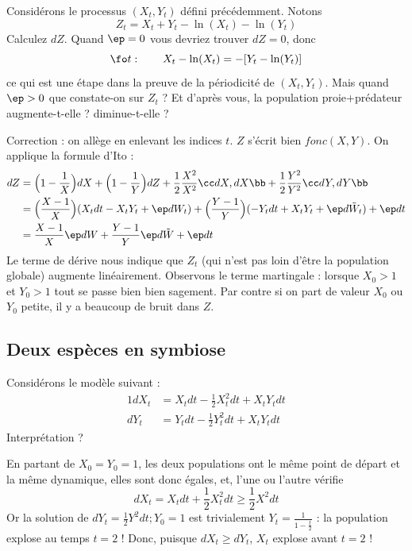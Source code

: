 \documentclass{article}
\begin{document}
\begin{exo}  Considérons le processus $(X_t,Y_t)$ défini précédemment. Notons 
$$
Z_t= X_t+Y_t - \ln(X_t) - \ln(Y_t)
$$
Calculez $dZ$.  Quand $ \ep=0 $ vous devriez trouver $dZ=0$, donc 
$$
\fo t :\qquad   X_t-\ln(X_t) =  - [Y_t -\ln(Y_t)  ]
$$ 
ce qui est une étape dans la preuve de la périodicité de $(X_t,Y_t)$.  Mais quand $\ep>0$ que constate-on sur $Z_t$ ? Et d'après vous, la population proie+prédateur augmente-t-elle ? diminue-t-elle ? 
\end{exo}


\begin{cor}
Correction : on allège en enlevant les indices $t$.  $Z$ s'écrit bien $fonc(X,Y)$. On applique la formule d'Ito : 
\begin{alignat*}{1}
dZ&=  \Big(1-\frac 1 X \Big) dX + \Big( 1- \frac 1 Y \Big) dZ + \frac 1 2 \frac {X^2} {X^2  }\cc dX , dX \bb + \frac 1 2 \frac {Y^2} {Y^2  }\cc dY , dY \bb \\
&=  \Big( \frac{X-1}X \Big) (X_t dt  - X_t Y_t  + \ep dW_t ) + \Big( \frac {Y-1}{Y} \Big) ( -Y_t dt  + X_t Y_t  + \ep d\tilde W_t) + \ep dt \\
&=  \frac {X-1}X \ep dW + \frac {Y-1}{Y} \ep d\tilde W + \ep dt
\end{alignat*}
Le terme de dérive nous indique que $Z_t$ (qui n'est pas loin d'être la population globale) augmente linéairement. Observons le terme martingale :  lorsque $X_0>1$ et $Y_0>1$ tout se passe bien bien sagement. Par contre si on part de valeur $X_0$ ou $Y_0$ petite, il y a beaucoup de bruit dans $Z$. 
\end{cor}





\subsection{Deux espèces en symbiose}

Considérons le modèle suivant : 
\begin{alignat*}{1}
dX_t &= X_t dt - \frac 12 X^2_t dt   +  X_t Y_tdt \\
dY_t &= Y_t dt - \frac 12 Y^2_t dt   +         X_t Y_t  dt 
\end{alignat*}
Interprétation ?

En partant de $X_0=Y_0=1$, les deux populations ont le même point de départ et la même dynamique, elles sont donc égales, et, l'une ou l'autre vérifie
$$
dX_t =  X_t dt + \frac 1 2  X^2_t dt \geq  \frac 1 2 X^2 dt 
$$
Or la solution de $dY_t =  \frac 1 2 Y^2 dt ; Y_0=1$ est trivialement $Y_t=\frac {1}{1-\frac t 2 }$ : la population explose au temps $t=2$ ! Donc, puisque $dX_t\geq dY_t$, $X_t$ explose   avant  $t=2$ !
\end{document}
